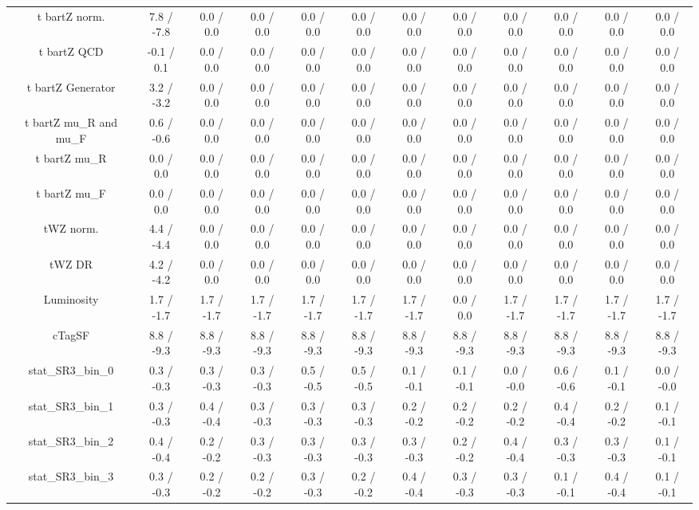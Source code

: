 \begin{table}[htbp]
\begin{center}
\begin{tabular}{|c|c|c|c|c|c|c|c|c|c|c|c|}
  t bar{t}Z norm. & 7.8 / -7.8 & 0.0 / 0.0 & 0.0 / 0.0 & 0.0 / 0.0 & 0.0 / 0.0 & 0.0 / 0.0 & 0.0 / 0.0 & 0.0 / 0.0 & 0.0 / 0.0 & 0.0 / 0.0 & 0.0 / 0.0 \\ 
  t bar{t}Z QCD & -0.1 / 0.1 & 0.0 / 0.0 & 0.0 / 0.0 & 0.0 / 0.0 & 0.0 / 0.0 & 0.0 / 0.0 & 0.0 / 0.0 & 0.0 / 0.0 & 0.0 / 0.0 & 0.0 / 0.0 & 0.0 / 0.0 \\ 
  t bar{t}Z Generator & 3.2 / -3.2 & 0.0 / 0.0 & 0.0 / 0.0 & 0.0 / 0.0 & 0.0 / 0.0 & 0.0 / 0.0 & 0.0 / 0.0 & 0.0 / 0.0 & 0.0 / 0.0 & 0.0 / 0.0 & 0.0 / 0.0 \\ 
  t bar{t}Z  mu_{R} and  mu_{F} & 0.6 / -0.6 & 0.0 / 0.0 & 0.0 / 0.0 & 0.0 / 0.0 & 0.0 / 0.0 & 0.0 / 0.0 & 0.0 / 0.0 & 0.0 / 0.0 & 0.0 / 0.0 & 0.0 / 0.0 & 0.0 / 0.0 \\ 
  t bar{t}Z  mu_{R} & 0.0 / 0.0 & 0.0 / 0.0 & 0.0 / 0.0 & 0.0 / 0.0 & 0.0 / 0.0 & 0.0 / 0.0 & 0.0 / 0.0 & 0.0 / 0.0 & 0.0 / 0.0 & 0.0 / 0.0 & 0.0 / 0.0 \\ 
  t bar{t}Z  mu_{F} & 0.0 / 0.0 & 0.0 / 0.0 & 0.0 / 0.0 & 0.0 / 0.0 & 0.0 / 0.0 & 0.0 / 0.0 & 0.0 / 0.0 & 0.0 / 0.0 & 0.0 / 0.0 & 0.0 / 0.0 & 0.0 / 0.0 \\ 
  tWZ norm. & 4.4 / -4.4 & 0.0 / 0.0 & 0.0 / 0.0 & 0.0 / 0.0 & 0.0 / 0.0 & 0.0 / 0.0 & 0.0 / 0.0 & 0.0 / 0.0 & 0.0 / 0.0 & 0.0 / 0.0 & 0.0 / 0.0 \\ 
  tWZ DR & 4.2 / -4.2 & 0.0 / 0.0 & 0.0 / 0.0 & 0.0 / 0.0 & 0.0 / 0.0 & 0.0 / 0.0 & 0.0 / 0.0 & 0.0 / 0.0 & 0.0 / 0.0 & 0.0 / 0.0 & 0.0 / 0.0 \\ 
  Luminosity & 1.7 / -1.7 & 1.7 / -1.7 & 1.7 / -1.7 & 1.7 / -1.7 & 1.7 / -1.7 & 1.7 / -1.7 & 0.0 / 0.0 & 1.7 / -1.7 & 1.7 / -1.7 & 1.7 / -1.7 & 1.7 / -1.7 \\ 
  cTagSF & 8.8 / -9.3 & 8.8 / -9.3 & 8.8 / -9.3 & 8.8 / -9.3 & 8.8 / -9.3 & 8.8 / -9.3 & 8.8 / -9.3 & 8.8 / -9.3 & 8.8 / -9.3 & 8.8 / -9.3 & 8.8 / -9.3 \\ 
 stat_SR3_bin_0 & 0.3 / -0.3 & 0.3 / -0.3 & 0.3 / -0.3 & 0.5 / -0.5 & 0.5 / -0.5 & 0.1 / -0.1 & 0.1 / -0.1 & 0.0 / -0.0 & 0.6 / -0.6 & 0.1 / -0.1 & 0.0 / -0.0 \\ 
 stat_SR3_bin_1 & 0.3 / -0.3 & 0.4 / -0.4 & 0.3 / -0.3 & 0.3 / -0.3 & 0.3 / -0.3 & 0.2 / -0.2 & 0.2 / -0.2 & 0.2 / -0.2 & 0.4 / -0.4 & 0.2 / -0.2 & 0.1 / -0.1 \\ 
 stat_SR3_bin_2 & 0.4 / -0.4 & 0.2 / -0.2 & 0.3 / -0.3 & 0.3 / -0.3 & 0.3 / -0.3 & 0.3 / -0.3 & 0.2 / -0.2 & 0.4 / -0.4 & 0.3 / -0.3 & 0.3 / -0.3 & 0.1 / -0.1 \\ 
 stat_SR3_bin_3 & 0.3 / -0.3 & 0.2 / -0.2 & 0.2 / -0.2 & 0.3 / -0.3 & 0.2 / -0.2 & 0.4 / -0.4 & 0.3 / -0.3 & 0.3 / -0.3 & 0.1 / -0.1 & 0.4 / -0.4 & 0.1 / -0.1 \\ 

\end{tabular}
\end{center}
\end{table}
